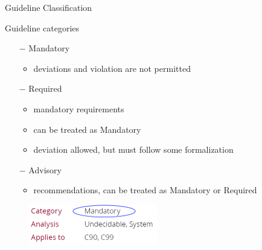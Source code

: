 \documentclass[t]{beamer} %
\begin{document}
\begin{frame}{Guideline Classification}
 \begin{block}{ Guideline categories}

	    \begin{itemize}
	        \item[$-$] Mandatory
	            \begin{itemize}
	                \item deviations and violation are not permitted
	            \end{itemize}{}
	        \item[$-$] Required
	            \begin{itemize}
	                \item mandatory requirements
	                \item can be treated as Mandatory
	                \item deviation allowed, but must follow some formalization
	            \end{itemize}{}
	        \item[$-$] Advisory
	            \begin{itemize}
	                \item recommendations, can be treated as Mandatory or Required
	            \end{itemize}{}
	    \end{itemize}{}
	     \begin{figure}[h]
                \includegraphics[width=0.5\textwidth]{example.PNG}
                \end{figure}
\end{block}
\end{frame}

\end{document}
